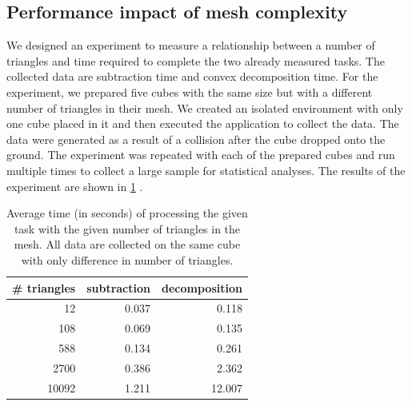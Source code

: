 \subsection{Performance impact of mesh complexity}
We designed an experiment to measure a relationship between a number of triangles and time required to complete the two already measured tasks. The collected data are subtraction time and convex decomposition time. For the experiment, we prepared five cubes with the same size but with a different number of triangles in their mesh. We created an isolated environment with only one cube placed in it and then executed the application to collect the data. The data were generated as a result of a collision after the cube dropped onto the ground. The experiment was repeated with each of the prepared cubes and run multiple times to collect a large sample for statistical analyses. The results of the experiment are shown in \cref{tab:subtraction-decomposition} . 
\begin{table}
\centering
\begin{tabular}{r r r}
\# triangles & subtraction & decomposition \\
\hline
12 & 0.037 & 0.118 \\
108 & 0.069 & 0.135 \\
588 & 0.134 & 0.261 \\ 
2700 & 0.386 & 2.362 \\ 
10092 & 1.211 & 12.007 \\
\end{tabular}
\caption{Average time (in seconds) of processing the given task with the given number of triangles in the mesh. All data are collected on the same cube with only difference in number of triangles.}
\label{tab:subtraction-decomposition}
\end{table}

